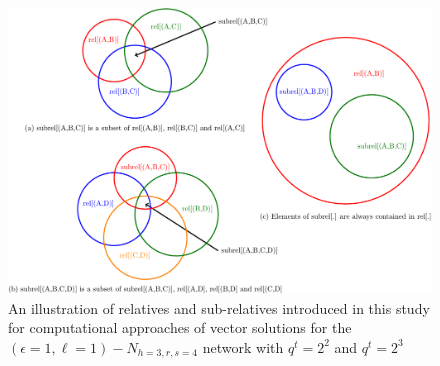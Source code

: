 \begin{figure}[H]
\caption{An illustration of relatives and sub-relatives introduced in this
study for computational approaches of vector solutions for the $\left(\epsilon=1,\ell=1\right)-\ensuremath{N}_{h=3,r,s=4}$
network with $q^{t}=2^{2}$ and $q^{t}=2^{3}$ \label{fig:rel_example}}

\centering{}\includegraphics[width=0.5\paperwidth]{./figures/rel_example}
\end{figure}

